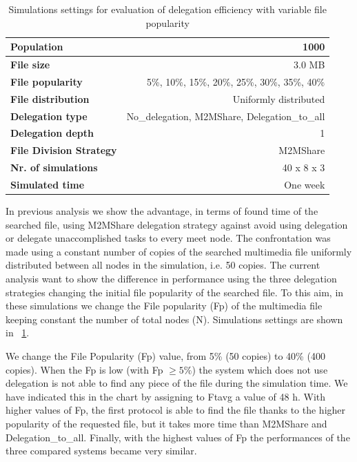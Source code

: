 \begin{table}[h]
\begin{center}
\begin{tabular}{|l|r|}
\hline
\bfseries Population & 1000 \\
\hline
\bfseries File size & 3.0 MB \\
\hline
\bfseries File popularity & 5\%, 10\%, 15\%, 20\%, 25\%, 30\%, 35\%, 40\% \\
\hline
\bfseries File distribution & Uniformly distributed \\
\hline
\bfseries Delegation type & No\_delegation, M2MShare, Delegation\_to\_all \\
\hline
\bfseries Delegation depth & 1 \\
\hline
\bfseries File Division Strategy & M2MShare \\
\hline
\bfseries Nr. of simulations & 40 x 8 x 3\\
\hline
\bfseries Simulated time & One week \\
\hline
\end{tabular}
\end{center}
\caption{Simulations settings for evaluation of delegation efficiency with variable file popularity\label{tab:settingsDiversaFilePop}}
\end{table}
In previous analysis we show the advantage, in terms of found time of the searched file, using M2MShare delegation strategy against avoid using delegation or delegate unaccomplished tasks to every meet node. The confrontation was made using a constant number of copies of the searched multimedia file uniformly distributed between all nodes in the simulation, i.e. 50 copies. The current analysis want to show the difference in performance using the three delegation strategies changing the initial file popularity of the searched file. To this aim, in these simulations we change the File popularity (Fp) of the multimedia file keeping constant the number of total nodes (N). Simulations settings are shown in \tablename~\ref{tab:settingsDiversaFilePop}.

We change the File Popularity (Fp) value, from 5\% (50 copies) to 40\% (400 copies). When the Fp is low (with Fp $\geq 5\%$) the system which does not use delegation is not able to find any piece of the file during the simulation time. We have indicated this in the chart by assigning to Ftavg a value of 48 h. With higher values of Fp, the first protocol is able to find the file thanks to the higher popularity of the requested file, but it takes more time than M2MShare and Delegation\_to\_all. Finally, with the highest values of Fp the performances of the three compared systems became very similar. 


